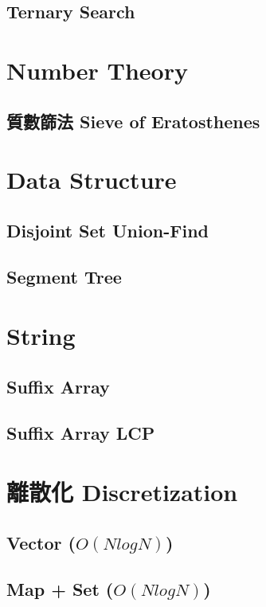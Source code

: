     \subsection{Ternary Search}
        
\section{Number Theory}
    \subsection{質數篩法 Sieve of Eratosthenes}
        

\section{Data Structure}
    \subsection{Disjoint Set Union-Find}
        
    \subsection{Segment Tree}
        

\section{String}
    \subsection{Suffix Array}
        
    \subsection{Suffix Array LCP}
        

\section{離散化 Discretization}
    \subsection{Vector ($O(NlogN)$)}
        
    \subsection{Map + Set ($O(NlogN)$)}
        